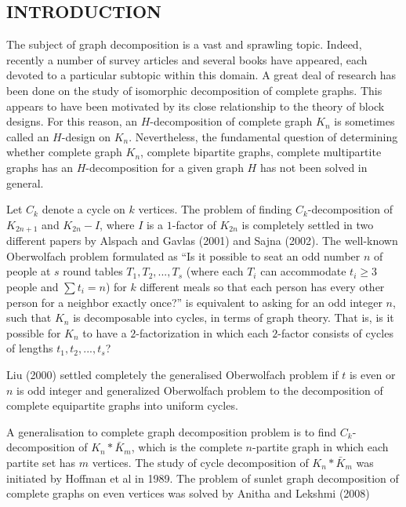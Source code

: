 \documentclass[12pt]{report}
\begin{document}
\begin{center}
\chapter{INTRODUCTION}
\end{center}
The subject of graph decomposition is a vast and sprawling topic.
Indeed, recently a number of survey articles and several books have
appeared, each devoted to a particular subtopic within this domain.
A great deal of research has been done on the study of isomorphic
decomposition of complete graphs. This appears to have been
motivated by its close relationship to the theory of block designs.
For this reason, an $H$-decomposition of complete graph $K_n$ is
sometimes called an $H$-design on $K_n$. Nevertheless, the
fundamental question of determining whether complete graph $K_n$,
complete bipartite graphs, complete multipartite graphs has an
$H$-decomposition for a given graph $H$ has not been solved in
general.

 Let $C_k$ denote a cycle on $k$ vertices. The problem of finding $C_k$-decomposition of $K_{2n+1}$ and $K_{2n}-I$, where $I$ is a $1$-factor of $K_{2n}$ is completely settled in two different papers by Alspach and Gavlas (2001) and Sajna (2002). The well-known Oberwolfach  problem formulated as ``Is it possible to seat an odd number $n$ of people at $s$ round
tables $T_1,T_2,...,T_s$ (where each $T_i$ can accommodate $t_i\geq
3$ people and $\sum t_i=n$) for $k$ different meals so that each
person has every other person for a neighbor exactly once?'' is
equivalent to
 asking for an odd integer $n$, such that $K_n$ is decomposable into cycles, in terms of graph theory.  That is, is it possible for $K_n$ to have a $2$-factorization in which each $2$-factor consists of cycles of lengths $t_1,t_2,...,t_s$?

 Liu (2000) settled completely %
 the generalised Oberwolfach problem  if $t$ is even or $n$ is odd integer and  generalized Oberwolfach problem to the decomposition of complete equipartite graphs into uniform cycles.

A generalisation to complete graph decomposition problem is to
find $C_k$-decomposition of $K_n*\bar{K}_m$, which is the complete
$n$-partite graph in which each partite set has $m$ vertices. The
study of cycle decomposition of $K_n*\bar{K}_m$ was initiated by
Hoffman et al in 1989. %
The problem of sunlet graph decomposition of complete graphs on even
vertices was solved by Anitha and Lekshmi (2008)%
\end{document}
